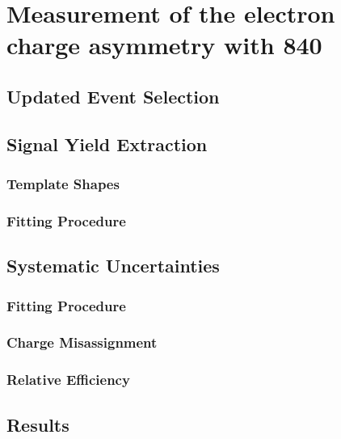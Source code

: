 \chapter{ 
Measurement of the electron charge asymmetry with \unit{840}{\invpb} }

\section{Updated Event Selection}

\section{Signal Yield Extraction}

\subsection{Template Shapes}

\subsection{Fitting Procedure}

\section{Systematic Uncertainties}

\subsection{Fitting Procedure}

\subsection{Charge Misassignment}

\subsection{Relative Efficiency}

\section{Results}
